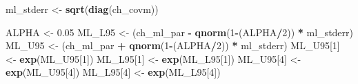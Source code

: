 \documentclass[
]{article}
\newenvironment{Shaded}{\begin{snugshade}}{\end{snugshade}}
\newcommand{\DecValTok}[1]{\textcolor[rgb]{0.00,0.00,0.81}{#1}}
\newcommand{\FloatTok}[1]{\textcolor[rgb]{0.00,0.00,0.81}{#1}}
\newcommand{\KeywordTok}[1]{\textcolor[rgb]{0.13,0.29,0.53}{\textbf{#1}}}
\newcommand{\NormalTok}[1]{#1}
\newcommand{\OperatorTok}[1]{\textcolor[rgb]{0.81,0.36,0.00}{\textbf{#1}}}
\newcommand{\StringTok}[1]{\textcolor[rgb]{0.31,0.60,0.02}{#1}}
\begin{document}
\begin{Shaded}
\begin{Highlighting}[]
\NormalTok{ml\_stderr \textless{}{-}}\StringTok{ }\KeywordTok{sqrt}\NormalTok{(}\KeywordTok{diag}\NormalTok{(ch\_covm))}

\NormalTok{ALPHA \textless{}{-}}\StringTok{ }\FloatTok{0.05}
\NormalTok{ML\_L95 \textless{}{-}}\StringTok{ }\NormalTok{(ch\_ml\_par }\OperatorTok{{-}}\StringTok{ }\KeywordTok{qnorm}\NormalTok{(}\DecValTok{1}\OperatorTok{{-}}\NormalTok{(ALPHA}\OperatorTok{/}\DecValTok{2}\NormalTok{)) }\OperatorTok{*}\StringTok{ }\NormalTok{ml\_stderr)}
\NormalTok{ML\_U95 \textless{}{-}}\StringTok{ }\NormalTok{(ch\_ml\_par }\OperatorTok{+}\StringTok{ }\KeywordTok{qnorm}\NormalTok{(}\DecValTok{1}\OperatorTok{{-}}\NormalTok{(ALPHA}\OperatorTok{/}\DecValTok{2}\NormalTok{)) }\OperatorTok{*}\StringTok{ }\NormalTok{ml\_stderr)}
\NormalTok{ML\_U95[}\DecValTok{1}\NormalTok{] \textless{}{-}}\StringTok{ }\KeywordTok{exp}\NormalTok{(ML\_U95[}\DecValTok{1}\NormalTok{])}
\NormalTok{ML\_L95[}\DecValTok{1}\NormalTok{] \textless{}{-}}\StringTok{ }\KeywordTok{exp}\NormalTok{(ML\_L95[}\DecValTok{1}\NormalTok{])}
\NormalTok{ML\_U95[}\DecValTok{4}\NormalTok{] \textless{}{-}}\StringTok{ }\KeywordTok{exp}\NormalTok{(ML\_U95[}\DecValTok{4}\NormalTok{])}
\NormalTok{ML\_L95[}\DecValTok{4}\NormalTok{] \textless{}{-}}\StringTok{ }\KeywordTok{exp}\NormalTok{(ML\_L95[}\DecValTok{4}\NormalTok{])}
\end{Highlighting}
\end{Shaded}

\begin{Shaded}
\end{Shaded}
\end{document}
